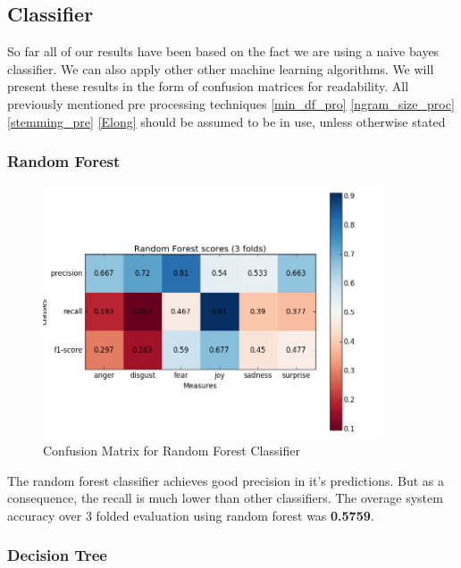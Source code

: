 \subsection{Classifier} \label{classifier_pro}

So far all of our results have been based on the fact we are using a naive bayes classifier. We can also apply other other machine learning algorithms. We will present these results in the form of confusion matrices for readability. All previously mentioned pre processing techniques \ref{min_df_pro} \ref{ngram_size_proc} \ref{stemming_pre} \ref{Elong} should be assumed to be in use, unless otherwise stated

\subsubsection{Random Forest}

\begin{figure}[H]
\center
\includegraphics[width=10cm]{images/random_forest_matrix.png}
\caption{Confusion Matrix for Random Forest Classifier}
\end{figure}

The random forest classifier achieves good precision in it's predictions. But as a consequence, the recall is much lower than other classifiers. The overage system accuracy over 3 folded evaluation using random forest was \textbf{0.5759}.

\subsubsection{Decision Tree}

